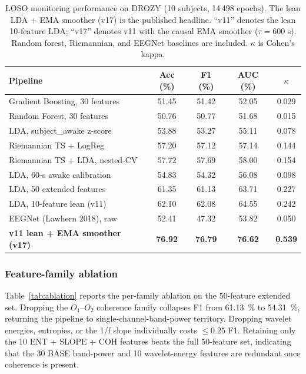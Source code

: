 \documentclass[journal]{IEEEtran}
\begin{document}
\begin{table}[t]
\caption{LOSO monitoring performance on DROZY (10 subjects, 14\,498 epochs). The lean LDA + EMA smoother (v17) is the published headline. ``v11'' denotes the lean 10-feature LDA; ``v17'' denotes v11 with the causal EMA smoother (\(\tau=600\) s). Random forest, Riemannian, and EEGNet baselines are included. \(\kappa\) is Cohen's kappa.}
\label{tab:loso}
\centering
\scriptsize
\setlength{\tabcolsep}{2pt}
\begin{tabular}{l c c c c}
\toprule
Pipeline & Acc (\%) & F1 (\%) & AUC (\%) & \(\kappa\) \\
\midrule
Gradient Boosting, 30 features      & 51.45 & 51.42 & 52.05 & 0.029 \\
Random Forest, 30 features          & 50.76 & 50.77 & 51.68 & 0.015 \\
LDA, subject\_awake z-score         & 53.88 & 53.27 & 55.11 & 0.078 \\
Riemannian TS + LogReg              & 57.20 & 57.12 & 57.14 & 0.144 \\
Riemannian TS + LDA, nested-CV      & 57.72 & 57.69 & 58.00 & 0.154 \\
LDA, 60-s awake calibration         & 54.83 & 54.32 & 56.08 & 0.098 \\
LDA, 50 extended features           & 61.35 & 61.13 & 63.71 & 0.227 \\
LDA, 10-feature lean (v11)          & 62.10 & 62.08 & 64.55 & 0.242 \\
EEGNet (Lawhern 2018), raw          & 52.41 & 47.32 & 53.82 & 0.050 \\
\textbf{v11 lean + EMA smoother (v17)} & \textbf{76.92} & \textbf{76.79} & \textbf{76.62} & \textbf{0.539} \\
\bottomrule
\end{tabular}
\end{table}

\subsubsection{Feature-family ablation}
\label{sec:ablation}
Table~\ref{tab:ablation} reports the per-family ablation on the 50-feature extended set. Dropping the \(O_1\)--\(O_2\) coherence family collapses F1 from 61.13~\% to 54.31~\%, returning the pipeline to single-channel-band-power territory. Dropping wavelet energies, entropies, or the 1/f slope individually costs \(\leq 0.25\) F1. Retaining only the 10 ENT + SLOPE + COH features beats the full 50-feature set, indicating that the 30 BASE band-power and 10 wavelet-energy features are redundant once coherence is present.
\end{document}
